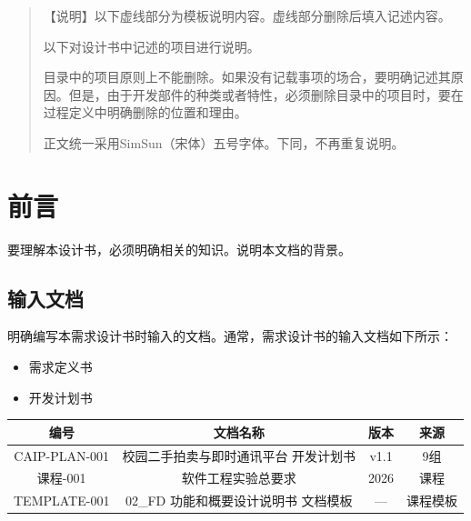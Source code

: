 \documentclass[12pt,a4paper]{ctexart}
\numberwithin{figure}{section}
\numberwithin{table}{section}
\begin{document}
\vspace{2em}

\begin{quote}
{\kaishu{}【说明】以下虚线部分为模板说明内容。虚线部分删除后填入记述内容。

以下对设计书中记述的项目进行说明。

目录中的项目原则上不能删除。如果没有记载事项的场合，要明确记述其原因。但是，由于开发部件的种类或者特性，必须删除目录中的项目时，要在过程定义中明确删除的位置和理由。

正文统一采用SimSun（宋体）五号字体。下同，不再重复说明。}
\end{quote}

\newpage
\tableofcontents
\newpage

\section{前言}

要理解本设计书，必须明确相关的知识。说明本文档的背景。

\subsection{输入文档}

明确编写本需求设计书时输入的文档。通常，需求设计书的输入文档如下所示：

\begin{itemize}
    \item 需求定义书
    \item 开发计划书
\end{itemize}

\begin{center}
\renewcommand{\arraystretch}{1.3}
\begin{tabular}{|c|c|c|c|}
\hline
\rowcolor{tableheader}
\textbf{编号} & \textbf{文档名称} & \textbf{版本} & \textbf{来源} \\
\hline
CAIP-PLAN-001 & 校园二手拍卖与即时通讯平台 开发计划书 & v1.1 & 9组 \\
\hline
课程-001 & 软件工程实验总要求 & 2026 & 课程 \\
\hline
TEMPLATE-001 & 02\_FD 功能和概要设计说明书 文档模板 & --- & 课程模板 \\
\hline
\end{tabular}
\end{center}
\end{document}
